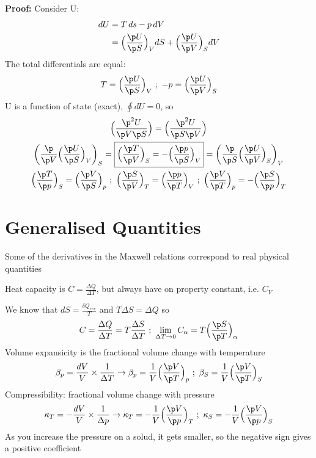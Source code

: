 \documentclass[a4paper, 11pt, normalem]{report}
\begin{document}
\textbf{Proof:}
Consider U:
\begin{align*}
    dU &= T\,ds - p\,dV \\
    &= \Big(\frac{\p U}{\p S}\Big)_V dS + \Big(\frac{\p U}{\p V}\Big)_S dV
\end{align*}
The total differentials are equal:
\begin{equation*}
    T = \Big(\frac{\p U}{\p S}\Big)_V ~;~ -p = \Big(\frac{\p U}{\p V}\Big)_S
\end{equation*}
U is a function of state (exact), $\oint dU = 0$, so
\begin{gather*}
    \Big(\frac{\p^2 U}{\p V \p S}\Big) = \Big(\frac{\p^2 U}{\p S \p V}\Big) \\
    \bigg(\frac{\p}{\p V} \Big(\frac{\p U}{\p S} \Big)_V \bigg)_S = \boxed{\Big(\frac{\p T}{\p V}\Big)_S = -\Big(\frac{\p p}{\p S} \Big)_V} = \bigg(\frac{\p}{\p S} \Big(\frac{\p U}{\p V}\Big)_S \bigg)_V \\
    \Big(\frac{\p T}{\p p}\Big)_S = \Big(\frac{\p V}{\p S}\Big)_p ~;~ \Big(\frac{\p S}{\p V} \Big)_T = \Big(\frac{\p p}{\p T}\Big)_V ~;~ \Big(\frac{\p V}{\p T}\Big)_p = -\Big(\frac{\p S}{\p p} \Big)_T
\end{gather*}

\section{Generalised Quantities}
Some of the derivatives in the Maxwell relations correspond to real physical quantities

Heat capacity is $C = \frac{\Delta Q}{\Delta T}$, but always have on property constant, i.e. $C_V$

We know that $dS = \frac{\delta Q_{rev}}{T}$ and $T\Delta S = \Delta Q$ so
\begin{equation*}
    C = \frac{\Delta Q}{\Delta T} = T\frac{\Delta S}{\Delta T} ~;~ \lim_{\Delta T \to 0} C_{\alpha} = T\Big(\frac{\p S}{\p T}\Big)_{\alpha}
\end{equation*}
Volume expansicity is the fractional volume change with temperature
\begin{equation*}
    \beta_{p} = \frac{dV}{V}\times\frac{1}{\Delta T} \to \beta_{p} = \frac{1}{V} \Big(\frac{\p V}{\p T}\Big)_p ~;~ \beta_S = \frac{1}{V} \Big(\frac{\p V}{\p T}\Big)_S
\end{equation*}
Compressibility: fractional volume change with pressure
\begin{equation*}
    \kappa_T = -\frac{dV}{V} \times \frac{1}{\Delta p} \to \kappa_T = -\frac{1}{V} \Big(\frac{\p V}{\p p}\Big)_T ~;~ \kappa_S = -\frac{1}{V} \Big(\frac{\p V}{\p p}\Big)_S
\end{equation*}
As you increase the pressure on a solud, it gets smaller, so the negative sign gives a positive coefficient
\end{document}
